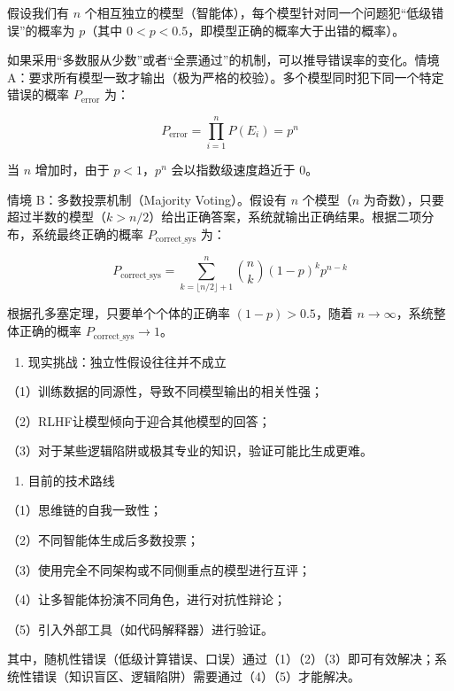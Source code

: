 假设我们有 \(n\) 个相互独立的模型（智能体），每个模型针对同一个问题犯``低级错误''的概率为 \(p\)（其中 \(0<p<0.5\)，即模型正确的概率大于出错的概率）。

如果采用``多数服从少数''或者``全票通过''的机制，可以推导错误率的变化。情境 A：要求所有模型一致才输出（极为严格的校验）。多个模型同时犯下同一个特定错误的概率 \(P_{\mathrm{error}}\) 为：

\[
P_{\mathrm{error}}=\prod_{i=1}^{n}P(E_i)=p^n
\]

当 \(n\) 增加时，由于 \(p<1\)，\(p^n\) 会以指数级速度趋近于 0。

情境 B：多数投票机制（Majority Voting）。假设有 \(n\) 个模型（\(n\) 为奇数），只要超过半数的模型（\(k>n/2\)）给出正确答案，系统就输出正确结果。根据二项分布，系统最终正确的概率 \(P_{\mathrm{correct\_sys}}\) 为：

\[
P_{\mathrm{correct\_sys}}=\sum_{k=\lfloor n/2\rfloor+1}^{n}\binom{n}{k}(1-p)^k p^{n-k}
\]

根据孔多塞定理，只要单个个体的正确率 \((1-p)>0.5\)，随着 \(n\to\infty\)，系统整体正确的概率 \(P_{\mathrm{correct\_sys}}\to 1\)。

\begin{enumerate}
\def\labelenumi{\arabic{enumi}.}
\setcounter{enumi}{1}
\tightlist
\item
  现实挑战：独立性假设往往并不成立
\end{enumerate}

（1）训练数据的同源性，导致不同模型输出的相关性强；

（2）RLHF让模型倾向于迎合其他模型的回答；

（3）对于某些逻辑陷阱或极其专业的知识，验证可能比生成更难。

\begin{enumerate}
\def\labelenumi{\arabic{enumi}.}
\setcounter{enumi}{2}
\tightlist
\item
  目前的技术路线
\end{enumerate}

（1）思维链的自我一致性；

（2）不同智能体生成后多数投票；

（3）使用完全不同架构或不同侧重点的模型进行互评；

（4）让多智能体扮演不同角色，进行对抗性辩论；

（5）引入外部工具（如代码解释器）进行验证。

其中，随机性错误（低级计算错误、口误）通过（1）（2）（3）即可有效解决；系统性错误（知识盲区、逻辑陷阱）需要通过（4）（5）才能解决。


